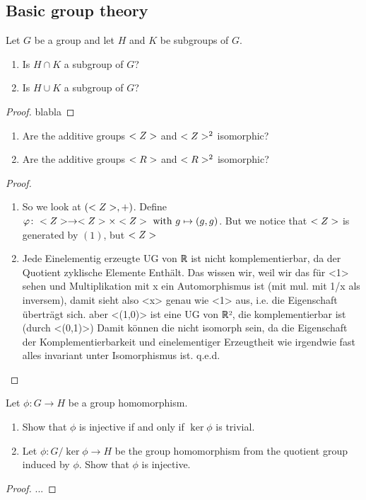 \subsection{Basic group theory}
\begin{*exercise}[Exercise 2.E.1]
	Let $G$ be a group and let $H$ and $K$ be
	subgroups of $G$.
	\begin{enumerate}
		\item Is $H \cap K$ a subgroup of $G$?
		\item Is $H \cup K$ a subgroup of $G$?
	\end{enumerate}
\end{*exercise}
\begin{proof}
	blabla
\end{proof}
\begin{*exercise}[Exercise 2.E.2]
	\begin{enumerate}
		\item Are the additive groups $<Z>$ and $<Z>^2$ isomorphic?
		\item Are the additive groups $<R>$ and $<R>^2$ isomorphic?
	\end{enumerate}
\end{*exercise}
\begin{proof}
	\begin{enumerate}
		\item So we look at $(<Z>,+)$. Define $\varphi\colon <Z> \to <Z> \times <Z> \text{ with } g \mapsto (g,g)$. But we notice that $<Z>$ is generated by $(1)$, but $<Z>$ 
		\item Jede Einelementig erzeugte UG von ℝ ist nicht komplementierbar, da der Quotient zyklische Elemente Enthält.
		Das wissen wir, weil wir das für <1> sehen und Multiplikation mit x ein Automorphismus ist (mit mul. mit 1/x als inversem), damit sieht also <x> genau wie <1> aus, i.e. die Eigenschaft überträgt sich.
		aber <(1,0)> ist eine UG von ℝ², die komplementierbar ist (durch <(0,1)>)
		Damit können die nicht isomorph sein, da die Eigenschaft der Komplementierbarkeit und einelementiger Erzeugtheit wie irgendwie fast alles invariant unter Isomorphismus ist.
		q.e.d.
	\end{enumerate}
\end{proof}
\begin{*exercise}[Exercise 2.E.3]
	Let $\phi\colon G \to H$ be a group homomorphism.
	\begin{enumerate}
		\item Show that $\phi$ is injective if and only if $\ker \phi$ is trivial.
		\item Let $\phi\colon G/\ker\phi \to H$ be the group homomorphism from the quotient
		group induced by $\phi$. Show that $\phi$ is injective.
	\end{enumerate}
\end{*exercise}
\begin{proof}
	...
\end{proof}